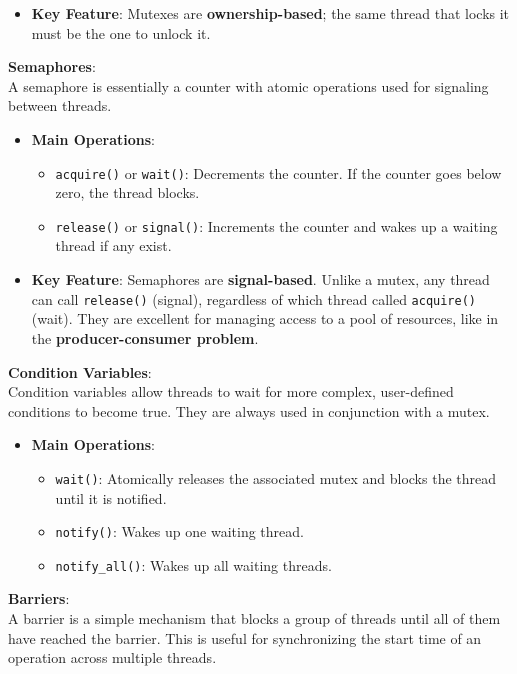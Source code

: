 \documentclass[10pt, a4paper]{article}
\begin{document}
\begin{multicols}{3}
\begin{itemize}[nosep]
\begin{itemize}[nosep]
    \end{itemize}
    \item \textbf{Key Feature}: Mutexes are \textbf{ownership-based}; the same thread that locks it must be the one to unlock it.
\end{itemize}
\textbf{Semaphores}: \\
A semaphore is essentially a counter with atomic operations used for signaling between threads.
\begin{itemize}[nosep] %
    \item \textbf{Main Operations}:
    \begin{itemize}[nosep] %
        \item \texttt{acquire()} or \texttt{wait()}: Decrements the counter. If the counter goes below zero, the thread blocks.
        \item \texttt{release()} or \texttt{signal()}: Increments the counter and wakes up a waiting thread if any exist.
    \end{itemize}
    \item \textbf{Key Feature}: Semaphores are \textbf{signal-based}. Unlike a mutex, any thread can call \texttt{release()} (signal), regardless of which thread called \texttt{acquire()} (wait). They are excellent for managing access to a pool of resources, like in the \textbf{producer-consumer problem}.
\end{itemize}
\textbf{Condition Variables}: \\
Condition variables allow threads to wait for more complex, user-defined conditions to become true. They are always used in conjunction with a mutex.
\begin{itemize}[nosep] %
    \item \textbf{Main Operations}:
    \begin{itemize}[nosep] %
        \item \texttt{wait()}: Atomically releases the associated mutex and blocks the thread until it is notified.
        \item \texttt{notify()}: Wakes up one waiting thread.
        \item \texttt{notify\_all()}: Wakes up all waiting threads.
    \end{itemize}
\end{itemize}
\textbf{Barriers}: \\
A barrier is a simple mechanism that blocks a group of threads until all of them have reached the barrier. This is useful for synchronizing the start time of an operation across multiple threads.

\end{multicols}
\end{document}
